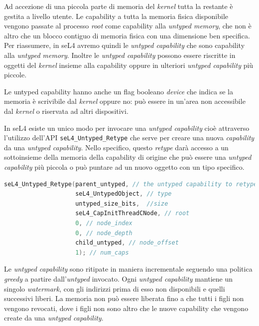 Ad accezione di una piccola parte di memoria del \textit{kernel} tutta la restante è gestita a livello utente. Le capability a tutta la memoria fisica disponibile vengono passate al processo \textit{root} come capability alla \textit{untyped memory}, che non è altro che un blocco contiguo di memoria fisica con una dimensione ben specifica. Per riassumere, in seL4 avremo quindi le \textit{untyped capability} che sono capability alla \textit{untyped memory}. Inoltre le \textit{untyped capability} possono essere riscritte in oggetti del \textit{kernel} insieme alla capability oppure in ulteriori \textit{untyped capability} più piccole.

Le untyped capability hanno anche un flag booleano \textit{device} che indica se la memoria è scrivibile dal \textit{kernel} oppure no: può essere in un'area non accessibile dal \textit{kernel} o riservata ad altri dispositivi.

In seL4 esiste un unico modo per invocare una \textit{untyped capability} cioè attraverso l'utilizzo dell'API \texttt{seL4\_Untyped\_Retype} che serve per creare una nuova \textit{capability} da una \textit{untyped capability}. Nello specifico, questo \textit{retype} darà accesso a un sottoinsieme della memoria della capability di origine che può essere una \textit{untyped capability} più piccola o può puntare ad un nuovo oggetto con un tipo specifico.
\begin{lstlisting}[language=C++]
seL4_Untyped_Retype(parent_untyped, // the untyped capability to retype
                    seL4_UntypedObject, // type
                    untyped_size_bits,  //size
                    seL4_CapInitThreadCNode, // root
                    0, // node_index
                    0, // node_depth
                    child_untyped, // node_offset
                    1); // num_caps
\end{lstlisting}

Le \textit{untyped capability} sono ritipate in maniera incrementale seguendo una politica \textit{greedy} a partire dall'\textit{untyped} invocato. Ogni \textit{untyped capability} mantiene un singolo \textit{watermark}, con gli indirizzi prima di esso non disponibili e quelli successivi liberi. La memoria non può essere liberata fino a che tutti i figli non vengono revocati, dove i figli non sono altro che le nuove capability che vengono create da una \textit{untyped capability}.

